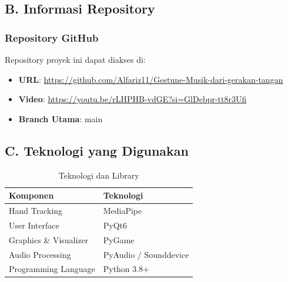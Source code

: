 \subsection*{B. Informasi Repository}

\subsubsection*{Repository GitHub}
Repository proyek ini dapat diakses di:
\begin{itemize}
    \item \textbf{URL}: \url{https://github.com/Alfariz11/Gestune-Musik-dari-gerakan-tangan}
    \item \textbf{Video}: \url{https://youtu.be/rLHPHB-vdGE?si=GlDebpr-tt8r3Ufi}
    \item \textbf{Branch Utama}: main
\end{itemize}

\subsection*{C. Teknologi yang Digunakan}

\begin{table}[H]
\centering
\caption{Teknologi dan Library}
\label{tab:technologies}
\begin{tabular}{ll}
\hline
\textbf{Komponen} & \textbf{Teknologi} \\ \hline
Hand Tracking & MediaPipe \\
User Interface & PyQt6 \\
Graphics \& Visualizer & PyGame \\
Audio Processing & PyAudio / Sounddevice \\
Programming Language & Python 3.8+ \\
\hline
\end{tabular}
\end{table}
